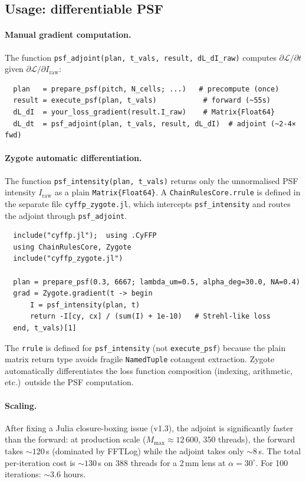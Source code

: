 \documentclass[11pt,a4paper]{article}
\begin{document}
\subsection{Usage: differentiable PSF}

\paragraph{Manual gradient computation.}
The function \texttt{psf\_adjoint(plan, t\_vals, result, dL\_dI\_raw)} computes
$\partial\mathcal{L}/\partial t$ given $\partial\mathcal{L}/\partial I_{\mathrm{raw}}$:
\begin{verbatim}
  plan   = prepare_psf(pitch, N_cells; ...)   # precompute (once)
  result = execute_psf(plan, t_vals)           # forward (~55s)
  dL_dI  = your_loss_gradient(result.I_raw)    # Matrix{Float64}
  dL_dt  = psf_adjoint(plan, t_vals, result, dL_dI)  # adjoint (~2-4× fwd)
\end{verbatim}

\paragraph{Zygote automatic differentiation.}
The function \texttt{psf\_intensity(plan, t\_vals)} returns only the
unnormalised PSF intensity $I_{\mathrm{raw}}$ as a plain \texttt{Matrix\{Float64\}}.
A \texttt{ChainRulesCore.rrule} is defined in the separate file
\texttt{cyffp\_zygote.jl}, which intercepts \texttt{psf\_intensity} and routes
the adjoint through \texttt{psf\_adjoint}.

\begin{verbatim}
  include("cyffp.jl");  using .CyFFP
  using ChainRulesCore, Zygote
  include("cyffp_zygote.jl")

  plan = prepare_psf(0.3, 6667; lambda_um=0.5, alpha_deg=30.0, NA=0.4)
  grad = Zygote.gradient(t -> begin
      I = psf_intensity(plan, t)
      return -I[cy, cx] / (sum(I) + 1e-10)   # Strehl-like loss
  end, t_vals)[1]
\end{verbatim}

\noindent
The \texttt{rrule} is defined for \texttt{psf\_intensity} (not
\texttt{execute\_psf}) because the plain matrix return type avoids fragile
\texttt{NamedTuple} cotangent extraction.  Zygote automatically differentiates
the loss function composition (indexing, arithmetic, etc.)\ outside the PSF
computation.

\paragraph{Scaling.}
After fixing a Julia closure-boxing issue (v1.3), the adjoint is
significantly faster than the forward: at production scale
($M_{\max} \approx 12\,600$, 350 threads), the forward takes
${\sim}120$\,s (dominated by FFTLog) while the adjoint takes only
${\sim}8$\,s.  The total per-iteration cost is ${\sim}130$\,s on
388 threads for a 2\,mm lens at $\alpha=30^\circ$.  For 100
iterations: ${\sim}3.6$ hours.
\end{document}
